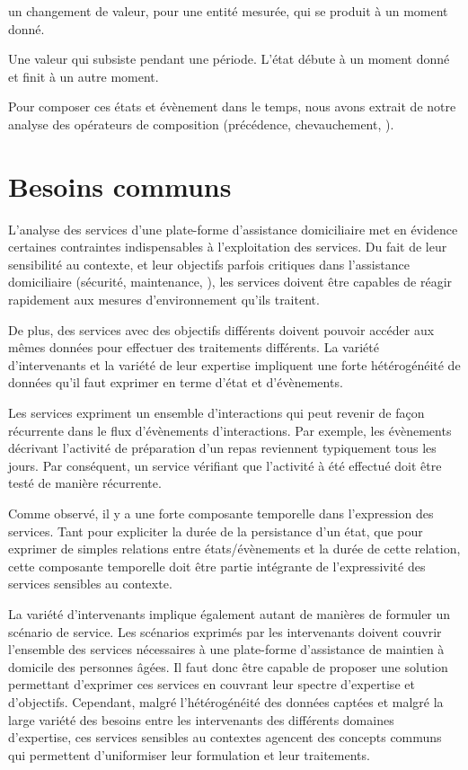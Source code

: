  un changement de valeur, pour une entité mesurée, qui se produit à un moment donné. 

 Une valeur qui subsiste pendant une période. L'état débute à un moment donné et finit à un autre moment.

Pour composer ces états et évènement dans le temps, nous avons extrait de notre analyse des opérateurs de composition (\eg précédence, chevauchement, \etc).

\section{Besoins communs}\label{domain:needs}
L'analyse des services d'une plate-forme d'assistance domiciliaire met en évidence certaines contraintes indispensables à l'exploitation des services. Du fait de leur sensibilité au contexte, et leur objectifs parfois critiques dans l'assistance domiciliaire (\eg sécurité, maintenance, \etc), les services doivent être capables de réagir rapidement aux mesures d'environnement qu'ils traitent.

De plus, des services avec des objectifs différents doivent pouvoir accéder aux mêmes données pour effectuer des traitements différents.
La variété d'intervenants et la variété de leur expertise impliquent une forte hétérogénéité de données qu'il faut exprimer en terme d'état et d'évènements.

Les services expriment un ensemble d'interactions qui peut revenir de façon récurrente dans le flux d'évènements d'interactions. Par exemple, les évènements décrivant l'activité de préparation d'un repas reviennent typiquement tous les jours. Par conséquent, un service vérifiant que l'activité à été effectué doit être testé de manière récurrente.

Comme observé, il y a une forte composante temporelle dans l'expression des services. Tant pour expliciter la durée de la persistance d'un état, que pour exprimer de simples relations entre états/évènements et la durée de cette relation, cette composante temporelle doit être partie intégrante de l'expressivité des services sensibles au contexte.

La variété d'intervenants implique également autant de manières de formuler un scénario de service.
Les scénarios exprimés par les intervenants doivent couvrir l'ensemble des services nécessaires à une plate-forme d'assistance de maintien à domicile des personnes âgées. Il faut donc être capable de proposer une solution permettant d'exprimer ces services en couvrant leur spectre d'expertise et d'objectifs. Cependant, malgré l'hétérogénéité des données captées et malgré la large variété des besoins entre les intervenants des différents domaines d'expertise, ces services sensibles au contextes agencent des concepts communs qui permettent d'uniformiser leur formulation et leur traitements.
